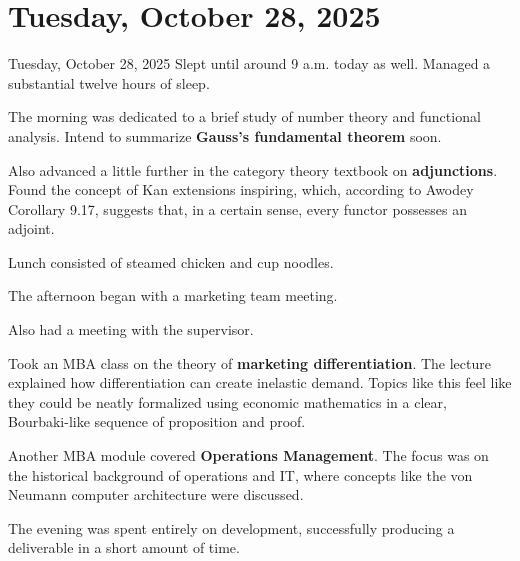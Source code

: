 \documentclass[dvipdfmx, autodetect-engine, aspectratio=169, 10.5pt]{beamer}
\begin{document}
\section{Tuesday, October 28, 2025}
\begin{frame}{Tuesday, October 28, 2025}
\scriptsize
Slept until around 9 a.m. today as well.
Managed a substantial twelve hours of sleep.

The morning was dedicated to a brief study of number theory and functional analysis. Intend to summarize \textbf{Gauss's fundamental theorem} soon.

Also advanced a little further in the category theory textbook on \textbf{adjunctions}. Found the concept of Kan extensions inspiring, which, according to Awodey Corollary 9.17, suggests that, in a certain sense, every functor possesses an adjoint.

Lunch consisted of steamed chicken and cup noodles.

The afternoon began with a marketing team meeting.

Also had a meeting with the supervisor.

Took an MBA class on the theory of \textbf{marketing differentiation}. The lecture explained how differentiation can create inelastic demand. Topics like this feel like they could be neatly formalized using economic mathematics in a clear, Bourbaki-like sequence of proposition and proof.

Another MBA module covered \textbf{Operations Management}. The focus was on the historical background of operations and IT, where concepts like the von Neumann computer architecture were discussed.

The evening was spent entirely on development, successfully producing a deliverable in a short amount of time.
\end{frame}
\end{document}
